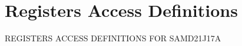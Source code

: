 \hypertarget{group___s_a_m_d21_j17_a__reg}{}\section{Registers Access Definitions}
\label{group___s_a_m_d21_j17_a__reg}
R\+E\+G\+I\+S\+T\+E\+RS A\+C\+C\+E\+SS D\+E\+F\+I\+N\+I\+T\+I\+O\+NS F\+OR S\+A\+M\+D21\+J17A 
